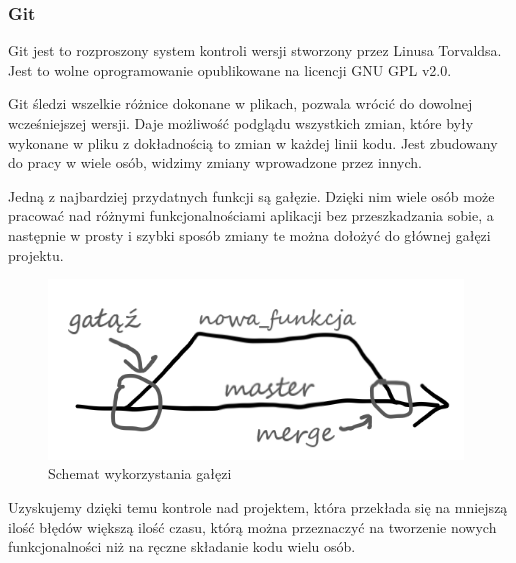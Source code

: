 \documentclass[a4paper,12pt, twoside]{article}
\begin{document}
    	\subsubsection{Git}
    	\vspace{.5cm}
    	Git jest to rozproszony system kontroli wersji stworzony przez Linusa Torvaldsa. Jest to wolne oprogramowanie opublikowane na licencji GNU GPL v2.0.
    	
    	Git śledzi wszelkie różnice dokonane w plikach, pozwala wrócić do dowolnej wcześniejszej wersji. Daje możliwość podglądu wszystkich zmian, które były wykonane w pliku z dokładnością to zmian w każdej linii kodu. Jest zbudowany do pracy w wiele osób, widzimy zmiany wprowadzone przez innych.
    	
    	Jedną z najbardziej przydatnych funkcji są gałęzie. Dzięki nim wiele osób może pracować nad różnymi funkcjonalnościami aplikacji bez przeszkadzania sobie, a następnie w prosty i szybki sposób zmiany te można dołożyć do głównej gałęzi projektu.
    		\begin{figure}[H]
    			\centering
    			\vspace{.5cm}
    			\includegraphics[width=11cm]{images/rys1_branches.png}
    			\vspace{.5cm}
    			\caption{Schemat wykorzystania gałęzi}
                \label{fig:branching}
    		\end{figure}
    
    	Uzyskujemy dzięki temu kontrole nad projektem, która przekłada się na mniejszą ilość błędów większą ilość czasu, którą można przeznaczyć na tworzenie nowych funkcjonalności niż na ręczne składanie kodu wielu osób.\cite{git}
    	
    	\newpage
\end{document}
